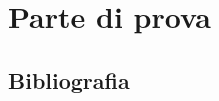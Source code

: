 \documentclass{studiolibro}
\begin{document}
\frontmatter
\occhietto
\frontespizio
\mainmatter
\part{Parte di prova}

\backmatter
\chapter{Bibliografia}
\printbibliography[heading=none]
\finis
\end{document}
